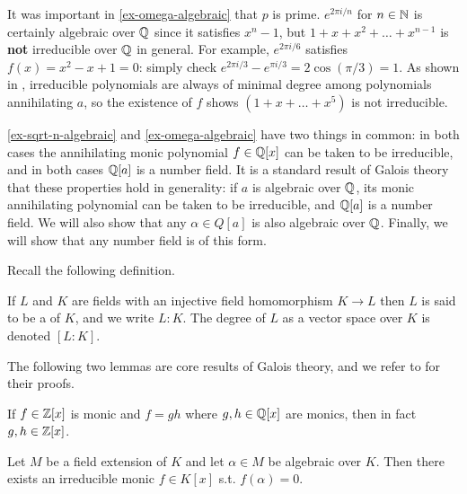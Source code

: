 \begin{remark}
It was important in \cref{ex-omega-algebraic} that $p$ is prime. $e^{2\pi i/n}$ for $n\in \mathbb{N}$ is certainly algebraic over $\mathbb{Q}$ since it satisfies $x^n-1$, but $1+x+x^2+\dots+x^{n-1}$ is \textbf{not} irreducible over $\mathbb{Q}$ in general. For example, $e^{2\pi i/6}$ satisfies $f(x)=x^2-x+1=0$: simply check $e^{2\pi i/3}-e^{\pi i/3}=2\cos(\pi/3)=1$. As shown in \cite{Galois}, irreducible polynomials are always of minimal degree among polynomials annihilating $a$, so the existence of $f$ shows $(1+x+\dots+x^{5})$ is not irreducible.
\end{remark}

\cref{ex-sqrt-n-algebraic} and \cref{ex-omega-algebraic} have two things in common: in both cases the annihilating monic polynomial $f\in \mathbb{Q}[x]$ can be taken to be irreducible, and in both cases $\mathbb{Q}[a]$ is a number field. It is a standard result of Galois theory that these properties hold in generality: if $a$ is algebraic over $\mathbb{Q}$, its monic annihilating polynomial can be taken to be irreducible, and $\mathbb{Q}[a]$ is a number field. We will also show that any $\alpha\in Q[a]$ is also algebraic over $\mathbb{Q}$. Finally, we will show that any number field is of this form.

Recall the following definition.
\begin{definition}
If $L$ and $K$ are fields with an injective field homomorphism $K\rightarrow L$  then $L$ is said to be a  of $K$, and we write $L:K$. The degree of $L$ as a vector space over $K$ is denoted $[L:K]$. 
\end{definition}
The following two lemmas are core results of Galois theory, and we refer to \cite{Galois} for their proofs.

\begin{lemma}\label{lemma-monics-are-Z}
If $f\in \mathbb{Z}[x]$ is monic and $f=gh$ where $g,h\in \mathbb{Q}[x]$ are monics, then in fact $g,h\in \mathbb{Z}[x]$.
\end{lemma}
\begin{lemma}\label{algebraic-satisfies-irreducible}
Let $M$ be a field extension of $K$ and let $\alpha\in M$ be algebraic over $K$. Then there exists an irreducible monic $f\in K[x]$ s.t. $f(\alpha)=0.$


\end{lemma}


